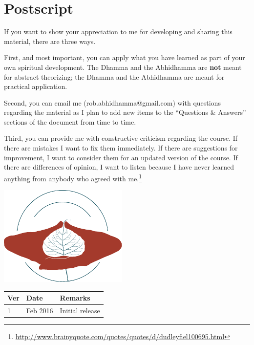 \section{Postscript}

If you want to show your appreciation to me for developing and sharing this material, there are three ways.

First, and most important, you can apply what you have learned as part of your own spiritual development. The Dhamma and the Abhidhamma are \textbf{not} meant for abstract theorizing; the Dhamma and the Abhidhamma are meant for practical application.

Second, you can email me (rob.abhidhamma@gmail.com) with questions regarding the material as I plan to add new items to the “Questions \& Answers” sections of the document from time to time.

Third, you can provide me with constructive criticism regarding the course. If there are mistakes I want to fix them immediately. If there are suggestions for improvement, I want to consider them for an updated version of the course. If there are differences of opinion, I want to listen because I have never learned anything from anybody who agreed with me.\footnote{\url{http://www.brainyquote.com/quotes/quotes/d/dudleyfiel100695.html}}
\\

\begin{center}
\includegraphics[width=0.6\linewidth]{./Diagrams/Back}
\end{center}

\vspace{10mm}

\begin{tabular*}{\textwidth}{lll}
\toprule
\textbf{Ver} & \textbf{Date} & \textbf{Remarks} \\ 
\midrule
1 & Feb 2016 & Initial release \\ 
\bottomrule
\end{tabular*} 

